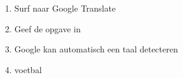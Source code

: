 \begin{enumerate}
  \item Surf naar Google Translate
  \item Geef de opgave in
  \item Google kan automatisch een taal detecteren
  \item voetbal
\end{enumerate}